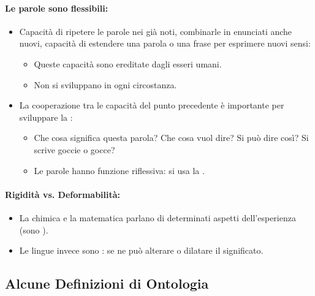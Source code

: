 \paragraph{Le parole sono flessibili:}

\begin{itemize}
  \item Capacità di ripetere le parole nei  già noti, combinarle in enunciati anche nuovi, capacità di estendere una parola o una frase per esprimere nuovi sensi: 
    \begin{itemize}
      \item Queste capacità sono ereditate dagli esseri umani. 
      \item Non si sviluppano in ogni circostanza. 
    \end{itemize} 
  \item La cooperazione tra le capacità del punto precedente è importante per sviluppare la :
    \begin{itemize}
      \item Che cosa significa questa parola? Che cosa vuol dire? Si può dire così? Si scrive goccie o gocce? 
      \item Le parole hanno funzione riflessiva: si usa la . 
    \end{itemize}
\end{itemize}

\paragraph{Rigidità vs. Deformabilità:}

\begin{itemize}
  \item La chimica e la matematica parlano di determinati aspetti dell'esperienza (sono ). 
  \item Le lingue invece sono : se ne può alterare o dilatare il significato.
\end{itemize}

\subsection{Alcune Definizioni di Ontologia}



